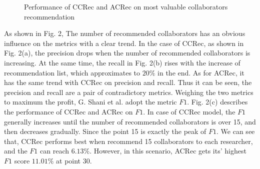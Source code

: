 \documentclass[review]{elsarticle}
\begin{document}
\begin{figure}
\centering
{}
\caption{Performance of CCRec and ACRec on most valuable collaborators recommendation}
\label{fig:2}
\end{figure}

As shown in Fig. 2, The number of recommended collaborators has an obvious influence on the metrics with a clear trend. In the case of CCRec, as shown in Fig. 2(a), the precision drops when the number of recommended collaborators is increasing. At the same time, the recall in Fig. 2(b) rises with the increase of recommendation list, which approximates to $20\%$ in the end. As for ACRec, it has the same trend with CCRec on precision and recall. Thus it can be seen, the precision and recall are a pair of contradictory metrics. Weighing the two metrics to maximum the profit, G. Shani et al. \cite{shani2011evaluating} adopt the metric $F1$. Fig. 2(c) describes the performance of CCRec and ACRec on $F1$. In case of CCRec model, the $F1$ generally increases until the number of recommended collaborators is over 15, and then decreases gradually. Since the point 15 is exactly the peak of $F1$. We can see that, CCRec performs best when recommend 15 collaborators to each researcher, and the $F1$ can reach $6.13\%$. However, in this scenario, ACRec gets its' highest $F1$ score $11.01\%$ at point 30.
\end{document}
